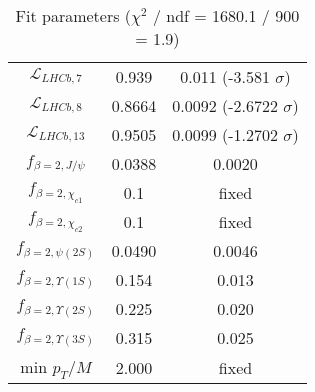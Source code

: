 \begin{table}[h!]
\begin{tabular}{c|c|c}
$\mathcal L_{LHCb,7}$ & 0.939 & 0.011 (-3.581 $\sigma$) \\
$\mathcal L_{LHCb,8}$ & 0.8664 & 0.0092 (-2.6722 $\sigma$) \\
$\mathcal L_{LHCb,13}$ & 0.9505 & 0.0099 (-1.2702 $\sigma$) \\
$f_{\beta=2,J/\psi}$ & 0.0388 & 0.0020 \\
$f_{\beta=2,\chi_{c1}}$ & 0.1 & fixed \\
$f_{\beta=2,\chi_{c2}}$ & 0.1 & fixed \\
$f_{\beta=2,\psi(2S)}$ & 0.0490 & 0.0046 \\
$f_{\beta=2,\Upsilon(1S)}$ & 0.154 & 0.013 \\
$f_{\beta=2,\Upsilon(2S)}$ & 0.225 & 0.020 \\
$f_{\beta=2,\Upsilon(3S)}$ & 0.315 & 0.025 \\
min $p_T/M$ & 2.000 & fixed \\
\end{tabular}
\caption{Fit parameters ($\chi^2$ / ndf = 1680.1 / 900 = 1.9)}
\end{table}
